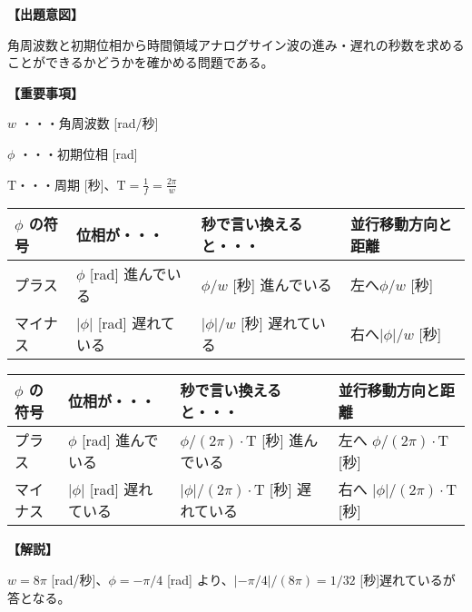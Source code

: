 \noindent \textbf{【出題意図】}

\noindent 角周波数と初期位相から時間領域アナログサイン波の進み・遅れの秒数を求めることができるかどうかを確かめる問題である。

\vspace{1em}
\noindent \textbf{【重要事項】}

\bigskip
\noindent $w$ ・・・角周波数 [rad/秒]

\bigskip
\noindent $\phi$ ・・・初期位相 [rad]

\bigskip
$\textrm{T}$・・・周期 [秒]、$\textrm{T} = \frac{1}{f} = \frac{2\pi}{w}$

\begin{center}
\begin{tabularx}{0.9\fbwidth}{|X|X|X|X|}
\hline
$\phi$ の符号&  位相が・・・   & 秒で言い換えると・・・   & 並行移動方向と距離 \\
\hline
プラス &  $\phi$ [rad] 進んでいる & $\phi/w$ [秒] 進んでいる & 左へ$\phi/w$ [秒] \\
\hline
マイナス &  $|\phi|$ [rad] 遅れている & $|\phi|/w$ [秒] 遅れている & 右へ$|\phi|/w$ [秒] \\
\hline
\end{tabularx}

\medskip
\begin{tabularx}{0.9\fbwidth}{|X|X|X|X|}
\hline
$\phi$ の符号&  位相が・・・   & 秒で言い換えると・・・   & 並行移動方向と距離 \\
\hline
プラス &  $\phi$ [rad] 進んでいる & $\phi/(2\pi) \cdot \textrm{T}$ [秒] 進んでいる & 左へ $\phi/(2\pi) \cdot \textrm{T}$ [秒] \\
\hline
マイナス &  $|\phi|$ [rad] 遅れている & $|\phi|/(2\pi) \cdot \textrm{T}$ [秒] 遅れている & 右へ $|\phi|/(2\pi) \cdot \textrm{T}$ [秒] \\
\hline
\end{tabularx}
\end{center}

\vspace{1em}
\noindent \textbf{【解説】}

\noindent $w = 8\pi$ [rad/秒]、$\phi = -\pi/4$ [rad] より、$|-\pi/4|/(8\pi) = 1/32$ [秒]遅れているが答となる。
